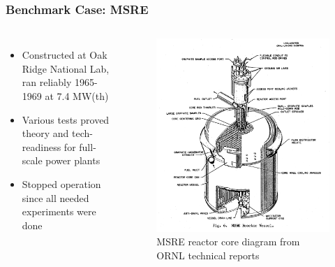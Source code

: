 \begin{frame}
    \frametitle{Benchmark Case: MSRE}
        \begin{columns}
            \column[t]{5cm}
            \begin{itemize} 
                \item{Constructed at Oak Ridge National Lab, ran reliably 1965-1969 at 7.4 MW(th)}


                \item{Various tests proved theory and tech-readiness for full-scale power plants}


                \item{Stopped operation since all needed experiments were done}
            \end{itemize}

            \column[t]{5cm}
            \begin{figure}[h]
            \includegraphics[width=\textwidth]{msreCore}
            \caption{MSRE reactor core diagram from ORNL technical reports}
        \end{figure}
        \end{columns}
\end{frame}


